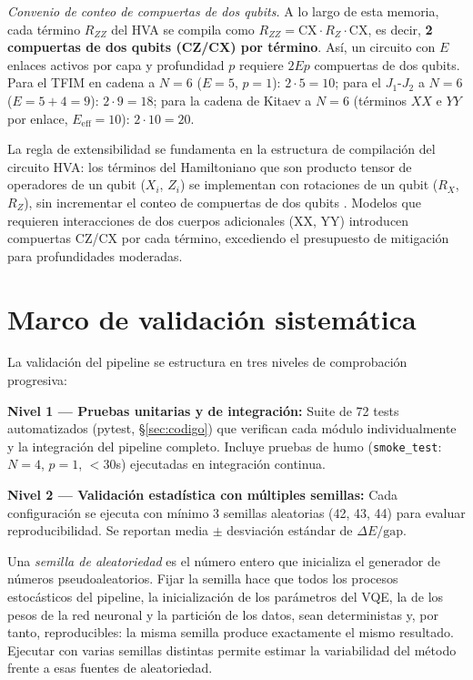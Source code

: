 \documentclass[11pt,a4paper,spanish]{book}
\begin{document}
\noindent\textit{Convenio de conteo de compuertas de dos qubits.} A lo largo de esta memoria, cada término $R_{ZZ}$ del HVA se compila como $R_{ZZ} = \text{CX} \cdot R_Z \cdot \text{CX}$, es decir, \textbf{2 compuertas de dos qubits (CZ/CX) por término}. Así, un circuito con $E$ enlaces activos por capa y profundidad $p$ requiere $2Ep$ compuertas de dos qubits. Para el TFIM en cadena a $N = 6$ ($E = 5$, $p = 1$): $2 \cdot 5 = 10$; para el $J_1$-$J_2$ a $N = 6$ ($E = 5 + 4 = 9$): $2 \cdot 9 = 18$; para la cadena de Kitaev a $N = 6$ (términos $XX$ e $YY$ por enlace, $E_{\text{eff}} = 10$): $2 \cdot 10 = 20$.

La regla de extensibilidad se fundamenta en la estructura de compilación del circuito HVA: los términos del Hamiltoniano que son producto tensor de operadores de un qubit ($X_i$, $Z_i$) se implementan con rotaciones de un qubit ($R_X$, $R_Z$), sin incrementar el conteo de compuertas de dos qubits \citep{wiersema2020}. Modelos que requieren interacciones de dos cuerpos adicionales (XX, YY) introducen compuertas CZ/CX por cada término, excediendo el presupuesto de mitigación para profundidades moderadas.

\section{Marco de validación sistemática}

La validación del pipeline se estructura en tres niveles de comprobación progresiva:

\textbf{Nivel 1 --- Pruebas unitarias y de integración:} Suite de 72 tests automatizados (pytest, §\ref{sec:codigo}) que verifican cada módulo individualmente y la integración del pipeline completo. Incluye pruebas de humo (\texttt{smoke\_test}: $N=4$, $p=1$, $<30$s) ejecutadas en integración continua.

\textbf{Nivel 2 --- Validación estadística con múltiples semillas:} Cada configuración se ejecuta con mínimo 3 semillas aleatorias (42, 43, 44) para evaluar reproducibilidad. Se reportan media $\pm$ desviación estándar de $\Delta E/\text{gap}$.

\noindent Una \emph{semilla de aleatoriedad} es el número entero que inicializa el generador de números pseudoaleatorios. Fijar la semilla hace que todos los procesos estocásticos del pipeline, la inicialización de los parámetros del VQE, la de los pesos de la red neuronal y la partición de los datos, sean deterministas y, por tanto, reproducibles: la misma semilla produce exactamente el mismo resultado. Ejecutar con varias semillas distintas permite estimar la variabilidad del método frente a esas fuentes de aleatoriedad.
\end{document}
